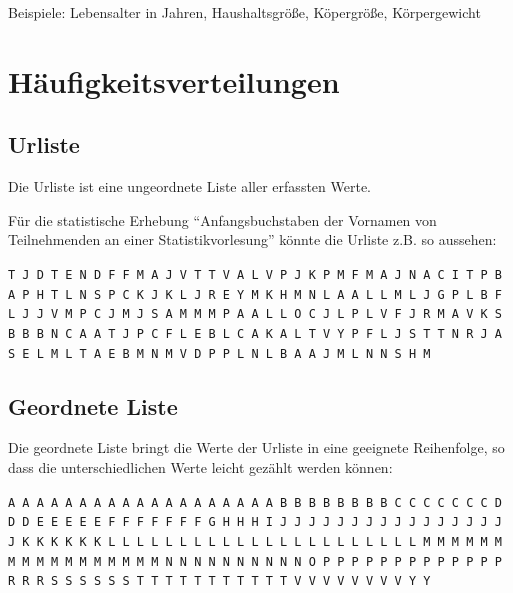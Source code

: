 \documentclass[
  11pt,
  ngerman,
  a4paper,
]{report}
\begin{document}
Beispiele: Lebensalter in Jahren, Haushaltsgröße, Köpergröße,
Körpergewicht

\hypertarget{huxe4ufigkeitsverteilungen}{%
\section{Häufigkeitsverteilungen}\label{huxe4ufigkeitsverteilungen}}

\nopagebreak

\hypertarget{urliste}{%
\subsection{Urliste}\label{urliste}}

Die Urliste ist eine ungeordnete Liste aller erfassten Werte.

Für die statistische Erhebung \enquote{Anfangsbuchstaben der Vornamen von Teilnehmenden an einer Statistikvorlesung} könnte die Urliste z.B. so aussehen:

\texttt{T\ J\ D\ T\ E\ N\ D\ F\ F\ M\ A\ J\ V\ T\ T\ V\ A\ L\ V\ P\ J\ K\ P\ M\ F\ M\ A\ J\ N\ A\ C\ I\ T\ P\ B\ A\ P\ H\ T\ L\ N\ S\ P\ C\ K\ J\ K\ L\ J\ R\ E\ Y\ M\ K\ H\ M\ N\ L\ A\ A\ L\ L\ M\ L\ J\ G\ P\ L\ B\ F\ L\ J\ J\ V\ M\ P\ C\ J\ M\ J\ S\ A\ M\ M\ M\ P\ A\ A\ L\ L\ O\ C\ J\ L\ P\ L\ V\ F\ J\ R\ M\ A\ V\ K\ S\ B\ B\ B\ N\ C\ A\ A\ T\ J\ P\ C\ F\ L\ E\ B\ L\ C\ A\ K\ A\ L\ T\ V\ Y\ P\ F\ L\ J\ S\ T\ T\ N\ R\ J\ A\ S\ E\ L\ M\ L\ T\ A\ E\ B\ M\ N\ M\ V\ D\ P\ P\ L\ N\ L\ B\ A\ A\ J\ M\ L\ N\ N\ S\ H\ M}

\hypertarget{geordnete-liste}{%
\subsection{Geordnete Liste}\label{geordnete-liste}}

Die geordnete Liste bringt die Werte der Urliste in eine geeignete Reihenfolge, so dass die unterschiedlichen Werte leicht gezählt werden können:

\texttt{A\ A\ A\ A\ A\ A\ A\ A\ A\ A\ A\ A\ A\ A\ A\ A\ A\ A\ A\ B\ B\ B\ B\ B\ B\ B\ B\ C\ C\ C\ C\ C\ C\ C\ D\ D\ D\ E\ E\ E\ E\ E\ F\ F\ F\ F\ F\ F\ F\ G\ H\ H\ H\ I\ J\ J\ J\ J\ J\ J\ J\ J\ J\ J\ J\ J\ J\ J\ J\ J\ J\ K\ K\ K\ K\ K\ K\ L\ L\ L\ L\ L\ L\ L\ L\ L\ L\ L\ L\ L\ L\ L\ L\ L\ L\ L\ L\ L\ L\ M\ M\ M\ M\ M\ M\ M\ M\ M\ M\ M\ M\ M\ M\ M\ M\ M\ N\ N\ N\ N\ N\ N\ N\ N\ N\ N\ O\ P\ P\ P\ P\ P\ P\ P\ P\ P\ P\ P\ P\ P\ R\ R\ R\ S\ S\ S\ S\ S\ S\ T\ T\ T\ T\ T\ T\ T\ T\ T\ T\ T\ V\ V\ V\ V\ V\ V\ V\ V\ Y\ Y}
\end{document}
